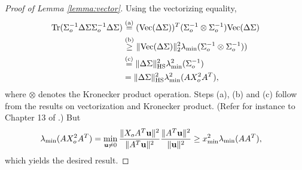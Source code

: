 \documentclass[onecolumn]{IEEEtran}
\begin{document}
\begin{proof}[Proof of Lemma \ref{lemma:vector}]
Using the vectorizing equality, 
\begin{align}
{\rm Tr}(\Sigma_o^{-1}\Delta \Sigma\Sigma_o^{-1}\Delta \Sigma)&\stackrel{\rm (a)}{=}({\rm Vec}( \Delta \Sigma))^T (\Sigma_o^{-1} \otimes \Sigma_o^{-1}) {\rm Vec}( \Delta \Sigma)\nonumber\\
&\stackrel{\rm (b)}{\geq}  \| {\rm Vec}( \Delta \Sigma)\|_2^2 \lambda_{\min}(\Sigma_o^{-1} \otimes \Sigma_o^{-1}))\nonumber\\
&\stackrel{\rm (c)}{=}   \|\Delta \Sigma \|^2_{\rm HS} \lambda^2_{\min}(\Sigma_o^{-1})\nonumber\\
&=     \|\Delta \Sigma \|^2_{\rm HS} \lambda^2_{\min}(AX_o^2A^T),\label{eq:lemma-vec-s1}
\end{align}
where  $\otimes$ denotes the Kronecker product operation. Steps (a), (b) and (c) follow from the results on vectorization and Kronecker product. (Refer for instance to  Chapter 13 of \cite{laub2005matrix}.) But
\begin{align}
\lambda_{\min}(AX_o^2A^T)&=\min_{{\bf u}\neq 0}{\|X_oA^T{\bf u}\|^2 \over \|A^T{\bf u}\|^2}{\|A^T{\bf u}\|^2\over \|{\bf u}\|^2}\geq x^2_{\min}\lambda_{\min}(AA^T),\label{eq:lemma-vec-s2}
\end{align}
which yields the desired result. 


\end{proof}
\end{document}
